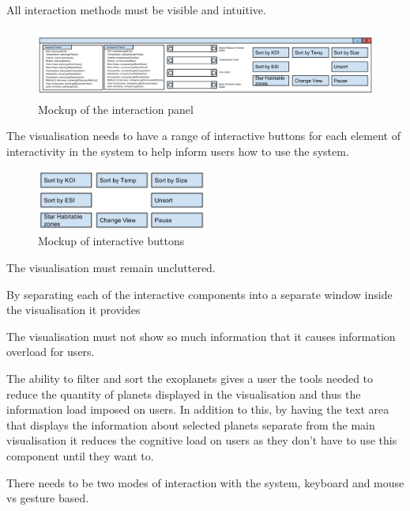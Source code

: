 \begin{enumerate}


{\bf \item[R6.] All interaction methods must be visible and intuitive.}
\begin{figure}[H]
  \centering
      \includegraphics[width=1\textwidth]{images/allTogether.png}
  \caption{Mockup of the interaction panel}  
\end{figure}

 The visualisation needs to have a range of interactive buttons for
each element of interactivity in the system to help inform users how to use the
system.

\begin{figure}[H]
  \centering
      \includegraphics[width=0.5\textwidth]{images/mockButtons.png}
  \caption{Mockup of interactive buttons}  
\end{figure}

{\bf \item[R7.] The visualisation must remain uncluttered.}

By separating each of the interactive components into a separate window inside
the visualisation it provides 

The visualisation must not show so much information that it
causes information overload for users.

The ability to filter and sort the exoplanets gives a user the tools needed to
reduce the quantity of planets displayed in the visualisation and thus the
information load imposed on users. 
In addition to this, by having the text area that displays the information about
selected planets separate from the main visualisation it reduces the cognitive
load on users as they don't have to use this component until they want to. ~


{\bf  \item[R8.] There needs to be two modes of interaction with the system,
keyboard and mouse vs gesture based.}


\end{enumerate}
